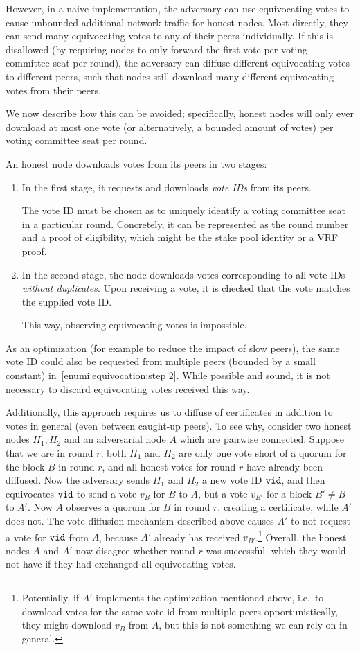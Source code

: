 However, in a naive implementation, the adversary can use equivocating votes to cause unbounded additional network traffic for honest nodes.
Most directly, they can send many equivocating votes to any of their peers individually.
If this is disallowed (by requiring nodes to only forward the first vote per voting committee seat per round), the adversary can diffuse different equivocating votes to different peers, such that nodes still download many different equivocating votes from their peers.

We now describe how this can be avoided; specifically, honest nodes will only ever download at most one vote (or alternatively, a bounded amount of votes) per voting committee seat per round.

An honest node downloads votes from its peers in two stages:
\begin{enumerate}
\item\label{enumi:equivocation:step 1}
  In the first stage, it requests and downloads \emph{vote IDs} from its peers.

  The vote ID must be chosen as to uniquely identify a voting committee seat in a particular round.
  Concretely, it can be represented as the round number and a proof of eligibility, which might be the stake pool identity or a VRF proof.
\item\label{enumi:equivocation:step 2}
  In the second stage, the node downloads votes corresponding to all vote IDs \emph{without duplicates}.
  Upon receiving a vote, it is checked that the vote matches the supplied vote ID.\@

  This way, observing equivocating votes is impossible.
\end{enumerate}
As an optimization (for example to reduce the impact of slow peers), the same vote ID could also be requested from multiple peers (bounded by a small constant) in~\ref{enumi:equivocation:step 2}.
While possible and sound, it is not necessary to discard equivocating votes received this way.

Additionally, this approach requires us to diffuse of certificates in addition to votes in general (even between caught-up peers).
To see why, consider two honest nodes $H_1,H_2$ and an adversarial node $A$ which are pairwise connected.
Suppose that we are in round $r$, both $H_1$ and $H_2$ are only one vote short of a quorum for the block $B$ in round $r$, and all honest votes for round $r$ have already been diffused.
Now the adversary sends $H_1$ and $H_2$ a new vote ID $\mathtt{vid}$, and then equivocates $\mathtt{vid}$ to send a vote $v_B$ for $B$ to $A$, but a vote $v_{B'}$ for a block $B' \neq B$ to $A'$.
Now $A$ observes a quorum for $B$ in round $r$, creating a certificate, while $A'$ does not.
The vote diffusion mechanism described above causes $A'$ to not request a vote for $\mathtt{vid}$ from $A$, because $A'$ already has received $v_{B'}$.\footnote{Potentially, if $A'$ implements the optimization mentioned above, i.e.\ to download votes for the same vote id from multiple peers opportunistically, they might download $v_B$ from $A$, but this is not something we can rely on in general.}
Overall, the honest nodes $A$ and $A'$ now disagree whether round $r$ was successful, which they would not have if they had exchanged all equivocating votes.

